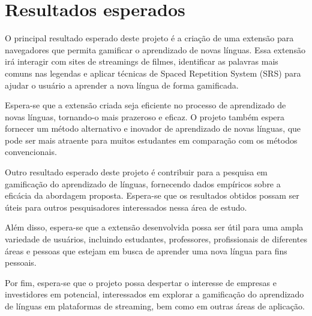 \documentclass[12pt]{article}
\begin{document}
\section{Resultados esperados}


O principal resultado esperado deste projeto é a criação de uma extensão para navegadores que permita gamificar o aprendizado de novas línguas. Essa extensão irá interagir com sites de streamings de filmes, identificar as palavras mais comuns nas legendas e aplicar técnicas de Spaced Repetition System (SRS) para ajudar o usuário a aprender a nova língua de forma gamificada.

Espera-se que a extensão criada seja eficiente no processo de aprendizado de novas línguas, tornando-o mais prazeroso e eficaz. O projeto também espera fornecer um método alternativo e inovador de aprendizado de novas línguas, que pode ser mais atraente para muitos estudantes em comparação com os métodos convencionais.

Outro resultado esperado deste projeto é contribuir para a pesquisa em gamificação do aprendizado de línguas, fornecendo dados empíricos sobre a eficácia da abordagem proposta. Espera-se que os resultados obtidos possam ser úteis para outros pesquisadores interessados nessa área de estudo.

Além disso, espera-se que a extensão desenvolvida possa ser útil para uma ampla variedade de usuários, incluindo estudantes, professores, profissionais de diferentes áreas e pessoas que estejam em busca de aprender uma nova língua para fins pessoais.

Por fim, espera-se que o projeto possa despertar o interesse de empresas e investidores em potencial, interessados em explorar a gamificação do aprendizado de línguas em plataformas de streaming, bem como em outras áreas de aplicação.



\end{document}
